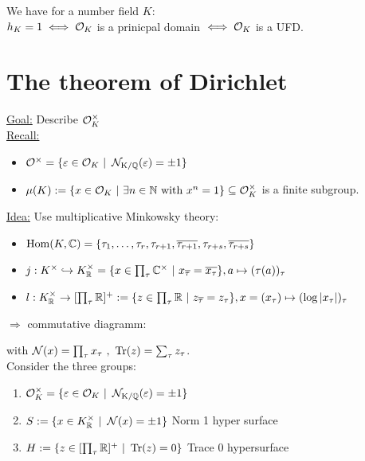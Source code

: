 \begin{Kor}
We have for a number field $K$:\\
$h_K=1 \iff \mathcal{O}_K$ is a prinicpal domain $\iff \mathcal{O}_K$ is a UFD.
\end{Kor}

\section{The theorem of Dirichlet}
\underline{Goal:} Describe $\mathcal{O}^\times_K$\\
\underline{Recall:}
\begin{itemize}
\item $\mathcal{O}^\times= \{\varepsilon \in \mathcal{O}_K \ | \ \operatorname{\mathcal{N}_{K/\mathbb{Q}}}(\varepsilon)= \pm 1\}$
\item $\mu(K):= \{x \in \mathcal{O}_K \ | \ \exists n \in \mathbb{N} \text{ with } x^n=1 \} \subseteq \mathcal{O}_K^\times$ is a finite subgroup.
\end{itemize}
\underline{Idea:} Use multiplicative Minkowsky theory:
\begin{itemize}
\item $\operatorname{Hom}(K, \mathbb{C}) = \{\tau_1, \dots, \tau_r, \tau_{r+1}, \overline{\tau_{r+1}}, \tau_{r+s}, \overline{\tau_{r+s}}\}$
\item $j : K^\times \hookrightarrow K^\times_{\mathbb{R}} = \{x \in \prod_\tau \mathbb{C}^\times \ | \ x_{\overline{\tau}} = \overline{x_\tau}\} , a \mapsto (\tau(a))_\tau$
\item $l : K^\times_{\mathbb{R}} \to [\prod_\tau \mathbb{R}]^+ := \{z \in \prod_\tau \mathbb{R} \ | \ z_{\overline{\tau}}=z_\tau \}, x=(x_\tau) \mapsto (\log|x_\tau|)_\tau$
\end{itemize}
$\Rightarrow$ commutative diagramm:\\

with $\Norm(x) = \prod_\tau x_\tau\ ,\ \Tr(z)=\sum_\tau z_\tau$.\\
Consider the three groups:
\begin{enumerate}[(1)]
\item $\mathcal{O}^\times_K = \{ \varepsilon \in \mathcal{O}_K \ | \ \operatorname{\mathcal{N}_{K/\mathbb{Q}}}(\varepsilon)=\pm 1 \}$
\item $S:= \{ x \in K^\times_\R \ | \ \Norm(x) = \pm 1 \}$ \glqq Norm 1 hyper surface\grqq
\item $H:= \{ z \in [\prod_\tau \R]^+ \ | \ \Tr(z)=0\}$ \glqq Trace 0 hypersurface\grqq
\end{enumerate}